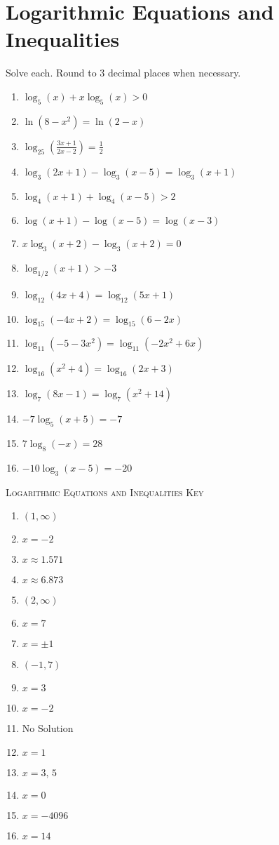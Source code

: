 \chapter{Logarithmic Equations and Inequalities}

Solve each. Round to 3 decimal places when necessary.
\begin{enumerate}
	\item $\log_5(x) + x\log_5(x) > 0$
	\item $\ln\left(8-x^2\right) = \ln(2-x)$
	\item $\log_{25}\left(\frac{3x+1}{2x-2}\right) = \frac{1}{2}$
	\item $\log_3(2x+1)-\log_3(x-5) = \log_3(x+1)$
	\item $\log_4(x+1) + \log_4(x-5) > 2$
	\item $\log(x+1) - \log(x-5) = \log(x-3)$
    \item $x\log_3(x+2)-\log_3(x+2)=0$
    \item $\log_{1/2}(x+1) > -3$
    
    \item $\log_{12}(4x+4) = \log_{12}(5x+1)$
    \item $\log_{15}(-4x+2) = \log_{15}(6-2x)$
    \item $\log_{11}(-5-3x^2) = \log_{11}(-2x^2+6x)$
    \item $\log_{16}(x^2+4) = \log_{16}(2x+3)$
    \item $\log_7(8x-1) = \log_7(x^2 + 14)$
    \item $-7\log_5(x+5) = -7$
    \item $7\log_8(-x) = 28$
    \item $-10\log_3(x-5) = -20$
\end{enumerate}

\newpage

\textsc{Logarithmic Equations and Inequalities Key}

\begin{enumerate}
	\item $(1, \infty)$
	\item $x = -2$
	\item $x \approx 1.571$
	\item $x \approx 6.873$
	\item $(2, \infty)$
	\item $x = 7$
    \item $x = \pm 1$
    \item $(-1,7)$
    \item $x = 3$
    \item $x = -2$
    \item No Solution
    \item $x = 1$
    \item $x = 3, \, 5$
    \item $x = 0$
    \item $x = -4096$
    \item $x = 14$
\end{enumerate}
